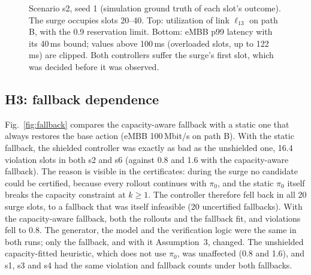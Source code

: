 \begin{figure}[t]
\caption{Scenario s2, seed 1 (simulation ground truth of each slot's outcome). The
surge occupies slots 20--40. Top: utilization of link $\ell_{13}$ on path B, with the
0.9 reservation limit. Bottom: eMBB p99 latency with its 40\,ms bound; values above
100\,ms (overloaded slots, up to 122\,ms) are clipped. Both controllers suffer the
surge's first slot, which was decided before it was observed.}
\label{fig:timeseries}
\end{figure}

\subsection{H3: fallback dependence}

Fig.~\ref{fig:fallback} compares the capacity-aware fallback with a static one that
always restores the base action (eMBB 100\,Mbit/s on path B). With the static
fallback, the shielded controller was exactly as bad as the unshielded one, 16.4
violation slots in both s2 and s6 (against 0.8 and 1.6 with the capacity-aware
fallback). The reason is visible in the certificates: during the surge no
candidate could be certified, because every rollout continues with $\pi_0$, and the
static $\pi_0$ itself breaks the capacity constraint at $k \ge 1$. The controller
therefore fell back in all 20 surge slots, to a fallback that was itself infeasible
(20 uncertified fallbacks). With the capacity-aware fallback, both the rollouts and
the fallback fit, and violations fell to 0.8. The generator, the model and the
verification logic were the same in both runs; only the fallback, and with it
Assumption~3, changed. The unshielded capacity-fitted heuristic, which does not use
$\pi_0$, was unaffected (0.8 and 1.6), and s1, s3 and s4 had the same violation and
fallback counts under both fallbacks.

